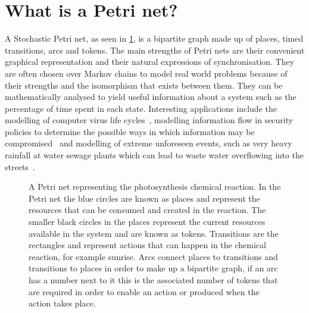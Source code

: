 \section{What is a Petri net?}
A Stochastic Petri net,  as seen in \cref{tikz:photo}, is a bipartite graph made up of places, timed transitions, arcs and tokens. The main strengths of Petri nets are their convenient graphical representation and their natural expressions of synchronisation. They are often chosen over Markov chains to model real world problems because of their strengths and the isomorphism that exists between them. They can be mathematically analysed to yield useful information about a system such as the percentage of time spent in each state. Interesting applications include the modelling of computer virus life cycles~\cite{kotenko2005analyzing}, modelling information flow in security policies to determine the possible ways in which information may be compromised~\cite{varadharajan1990petri} and modelling of extreme unforeseen events, such as very heavy rainfall at water sewage plants which can lead to waste water overflowing into the streets~\cite{ghasemieh2013analysis}.

\begin{figure}[tb]

\caption{A Petri net representing the photosynthesis chemical reaction. In the Petri net the blue circles are known as places and represent the resources that can be consumed and created in the reaction. The smaller black circles in the places represent the current resources available in the system and are known as tokens. Transitions are the rectangles and represent actions that can happen in the chemical reaction, for example sunrise. Arcs connect places to transitions and transitions to places in order to make up a bipartite graph, if an arc has a number next to it this is the associated number of tokens that are required in order to enable an action or produced when the action takes place.}
\label{tikz:photo}
\end{figure}